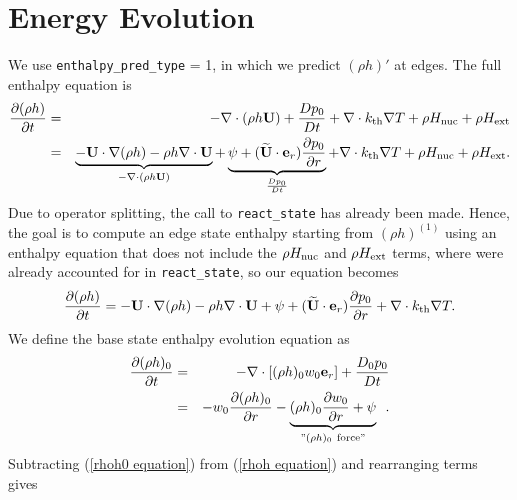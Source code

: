 \section{Energy Evolution}
We use {\tt enthalpy\_pred\_type} = 1, in which we predict $(\rho h)'$ at edges.
The full enthalpy equation is
\begin{eqnarray}
\frac{\partial(\rho h)}{\partial t} &=& -\nabla\cdot(\rho h {\bf U}) + \frac{Dp_0}{Dt} 
+ \nabla\cdot k_{\rm th} \nabla T + \rho H_{\rm nuc} + \rho H_{\rm ext} \nonumber \\
&=& \underbrace{-{\bf U}\cdot\nabla(\rho h) - \rho h\nabla\cdot{\bf U}}_{-\nabla\cdot(\rho h{\bf U})} 
+ \underbrace{\psi + (\widetilde{{\bf U}} \cdot \mathbf{e}_r) \frac{\partial p_0}{\partial r}}_{\frac{Dp_0}{Dt}} 
+ \nabla\cdot k_{\rm th}\nabla T + \rho H_{\rm nuc} + \rho H_{\rm ext}.
\end{eqnarray}
Due to operator splitting, the call to {\tt react\_state} has already
been made.  Hence, the goal is to compute an edge state enthalpy
starting from $(\rho h)^{(1)}$ using an enthalpy equation that does
not include the $\rho H_{\rm nuc}$ and $\rho H_{\rm ext}$ terms, where
were already accounted for in {\tt react\_state}, so our equation becomes
\begin{equation}
\frac{\partial(\rho h)}{\partial t} = -{\bf U}\cdot\nabla(\rho h) - \rho h\nabla\cdot{\bf U} 
+ \psi + (\widetilde{{\bf U}} \cdot \mathbf{e}_r) \frac{\partial p_0}{\partial r} + \nabla\cdot k_{\rm th}\nabla T. \label{rhoh equation}
\end{equation}
We define the base state enthalpy evolution equation as
\begin{eqnarray}
\frac{\partial(\rho h)_0}{\partial t} &=& -\nabla\cdot[(\rho h)_0 w_0{\bf e}_r] 
+ \frac{D_0p_0}{Dt} \nonumber \\
&=& -w_0\frac{\partial(\rho h)_0}{\partial r} 
- \underbrace{(\rho h)_0\frac{\partial w_0}{\partial r}+ \psi}_{"(\rho h)_0 ~ \text{force}"}
\enskip .\label{rhoh0 equation}
\end{eqnarray}
Subtracting (\ref{rhoh0 equation}) from (\ref{rhoh equation}) and rearranging terms gives 
